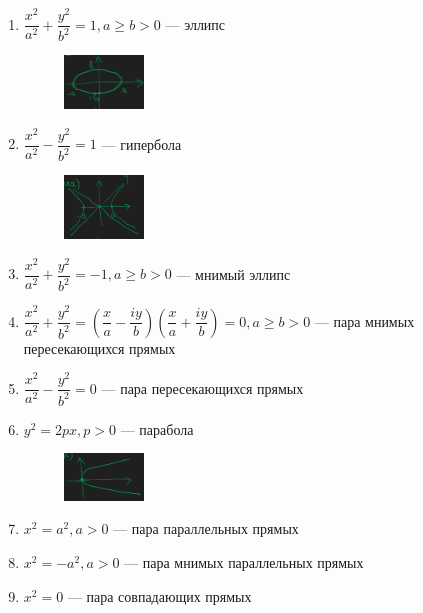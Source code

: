 \documentclass[a4paper]{article}
\begin{document}
\begin{colloq}
        \begin{enumerate}
            \item $\dfrac{x^2}{a^2} + \dfrac{y^2}{b^2} = 1, a \geq b > 0$ --- эллипс
                \begin{figure}[H]
                    \centering
                    \includegraphics[width=0.2\textwidth]{ellipse}
                \end{figure}
            \item $\dfrac{x^2}{a^2} - \dfrac{y^2}{b^2} = 1$ --- гипербола
                \begin{figure}[H]
                    \centering
                    \includegraphics[width=0.2\textwidth]{hyperbola}
                \end{figure}
            \item $\dfrac{x^2}{a^2} + \dfrac{y^2}{b^2} = -1, a \geq b > 0$ --- мнимый эллипс
            \item $\dfrac{x^2}{a^2} + \dfrac{y^2}{b^2} = (\dfrac{x}{a} - \dfrac{iy}{b}) (\dfrac{x}{a} + \dfrac{iy}{b}) = 0, a \geq b > 0$ --- пара мнимых пересекающихся прямых
            \item $\dfrac{x^2}{a^2} - \dfrac{y^2}{b^2} = 0$ --- пара пересекающихся прямых
            \item $y^2 = 2px, p > 0$ --- парабола
                \begin{figure}[H]
                    \centering
                    \includegraphics[width=0.2\textwidth]{parabola}
                \end{figure}
            \item $x^2 = a^2, a > 0$ --- пара параллельных прямых
            \item $x^2 = -a^2, a > 0$ --- пара мнимых параллельных прямых
            \item $x^2 = 0$ --- пара совпадающих прямых
        \end{enumerate}
    

\end{colloq}
\end{document}
